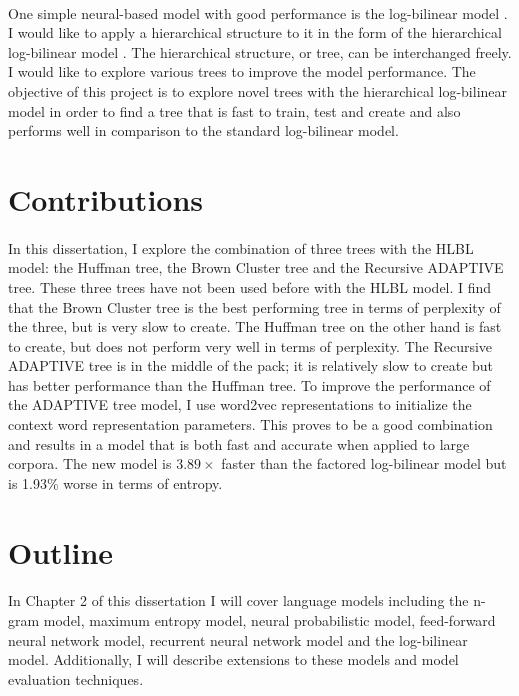 \paragraph{}
One simple neural-based model with good performance is the log-bilinear model \cite{MnihHinton2007}. I would like to apply a hierarchical structure to it in the form of the hierarchical log-bilinear model \cite{MnihHinton2009}. The hierarchical structure, or tree, can be interchanged freely. I would like to explore various trees to improve the model performance. The objective of this project is to explore novel trees with the hierarchical log-bilinear model in order to find a tree that is fast to train, test and create and also performs well in comparison to the standard log-bilinear model.

\section{Contributions}
\paragraph{}
In this dissertation, I explore the combination of three trees with the HLBL model: the Huffman tree, the Brown Cluster tree and the Recursive ADAPTIVE tree. These three trees have not been used before with the HLBL model. I find that the Brown Cluster tree is the best performing tree in terms of perplexity of the three, but is very slow to create. The Huffman tree on the other hand is fast to create, but does not perform very well in terms of perplexity. The Recursive ADAPTIVE tree is in the middle of the pack; it is relatively slow to create but has better performance than the Huffman tree. To improve the performance of the ADAPTIVE tree model, I use word2vec representations to initialize the context word representation parameters. This proves to be a good combination and results in a model that is both fast and accurate when applied to large corpora. The new model is $3.89\times$ faster than the factored log-bilinear model but is 1.93\% worse in terms of entropy.

\section{Outline}
\paragraph{}
In Chapter 2 of this dissertation I will cover language models including the n-gram model, maximum entropy model, neural probabilistic model, feed-forward neural network model, recurrent neural network model and the log-bilinear model. Additionally, I will describe extensions to these models and model evaluation techniques.

